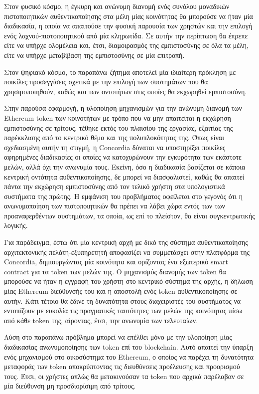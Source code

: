 Στον φυσικό κόσμο, η έγκυρη και ανώνυμη διανομή ενός συνόλου μοναδικών πιστοποιητικών αυθεντικοποίησης στα μέλη μίας κοινότητας θα μπορούσε να ήταν μία διαδικασία, η οποία να απαιτούσε την φυσική παρουσία των χρηστών και την επιλογή ενός λαχνού-πιστοποιητικού από μία κληρωτίδα. Σε αυτήν την περίπτωση θα έπρεπε είτε να υπήρχε ολομέλεια και, έτσι, διαμοιρασμός της εμπιστοσύνης σε όλα τα μέλη, είτε να υπήρχε μεταβίβαση της εμπιστοσύνης σε μία επιτροπή.

Στον ψηφιακό κόσμο, το παραπάνω ζήτημα αποτελεί μία ιδιαίτερη πρόκληση με ποικίλες προσεγγίσεις σχετικά με την επιλογή των συστημάτων που θα χρησιμοποιηθούν, καθώς και των οντοτήτων στις οποίες θα εκχωρηθεί εμπιστοσύνη.

Στην παρούσα εφαρμογή, η υλοποίηση μηχανισμών για την ανώνυμη διανομή των Ethereum token των κοινοτήτων με τρόπο που να μην απαιτείται η εκχώρηση εμπιστοσύνης σε τρίτους, τέθηκε εκτός του πλαισίου της εργασίας, εξαιτίας της παρέκκλισης από το κεντρικό θέμα και της πολυπλοκότητας της. Όπως είναι σχεδιασμένη αυτήν τη στιγμή, η Concordia δύναται να υποστηρίξει ποικίλες αφηρημένες διαδικασίες οι οποίες να κατοχυρώνουν την εγκυρότητα των εκάστοτε μελών, αλλά όχι την ανωνυμία τους. Εκείνη, όσο η διαδικασία βασίζεται σε κάποια κεντρική οντότητα αυθεντικοποίησης, δε μπορεί να διασφαλιστεί, καθώς θα απαιτεί πάντα την εκχώρηση εμπιστοσύνης από τον τελικό χρήστη στα υπολογιστικά συστήματα της πρώτης. Η εμφάνιση του προβλήματος οφείλεται στο γεγονός ότι η ανωνυμοποίηση των πιστοποιητικών θα πρέπει να λάβει χώρα εντός των των προαναφερθέντων συστημάτων, τα οποία, ως επί το πλείστον, θα είναι συγκεντρωτικής λογικής.

Για παράδειγμα, έστω ότι μία κεντρική αρχή με δικό της σύστημα αυθεντικοποίησης αρχιτεκτονικής πελάτη-εξυπηρετητή αποφασίζει να συμμετάσχει στην πλατφόρμα της Concordia, δημιουργώντας μία κοινότητα και ορίζοντας ένα εξωτερικό smart contract για τα token των μελών της. Ο μηχανισμός διανομής των token θα μπορούσε να ήταν η εγγραφή του χρήστη στο κεντρικό σύστημα της αρχής, η δήλωση μίας Ethereum διεύθυνσής του και η αποστολή ενός token αυθεντικοποίησης σε αυτήν. Κάτι τέτοιο θα έδινε τη δυνατότητα στους διαχειριστές του συστήματος να εντοπίζουν με ευκολία τις πραγματικές ταυτότητες των μελών της κοινότητας πίσω από κάθε token της, αίροντας, έτσι, την ανωνυμία των τελευταίων.

Λύση στο παραπάνω πρόβλημα μπορεί να επέλθει μόνο με την υλοποίηση μίας διαδικασίας ανωνυμοποίησης των token επί του blockchain. Αυτό απαιτεί την ύπαρξη ενός μηχανισμού στο οικοσύστημα του Ethereum, ο οποίος να παρέχει τη δυνατότητα μεταφοράς των token αποκρύπτοντας τις διευθύνσεις προέλευσης και προορισμού τους. Έτσι, οι χρήστες απλώς θα μετακινούσαν τα token που αρχικά παρέλαβαν σε μία διεύθυνση μη προσδιορίσιμη από τρίτους.


